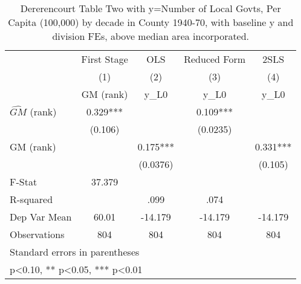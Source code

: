\begin{table}[htbp]\centering
\def\sym#1{\ifmmode^{#1}\else\(^{#1}\)\fi}
\caption{Dererencourt Table Two with y=Number of Local Govts, Per Capita (100,000) by decade in County 1940-70, with baseline y and division FEs, above median area incorporated.}
\begin{tabular}{l*{4}{c}}
\toprule
                    & First Stage   &         OLS   &Reduced Form   &        2SLS   \\
                    &\multicolumn{1}{c}{(1)}&\multicolumn{1}{c}{(2)}&\multicolumn{1}{c}{(3)}&\multicolumn{1}{c}{(4)}\\
                    &\multicolumn{1}{c}{GM  (rank)}&\multicolumn{1}{c}{y\_L0}&\multicolumn{1}{c}{y\_L0}&\multicolumn{1}{c}{y\_L0}\\
\midrule
$\hat{GM}$ (rank)   &       0.329***&               &       0.109***&               \\
                    &     (0.106)   &               &    (0.0235)   &               \\
\addlinespace
GM  (rank)          &               &       0.175***&               &       0.331***\\
                    &               &    (0.0376)   &               &     (0.105)   \\
\midrule
F-Stat              &      37.379   &               &               &               \\
R-squared           &               &        .099   &        .074   &               \\
Dep Var Mean        &       60.01   &     -14.179   &     -14.179   &     -14.179   \\
Observations        &         804   &         804   &         804   &         804   \\
\bottomrule
\multicolumn{5}{l}{\footnotesize Standard errors in parentheses}\\
\multicolumn{5}{l}{\footnotesize * p<0.10, ** p<0.05, *** p<0.01}\\
\end{tabular}
\end{table}
